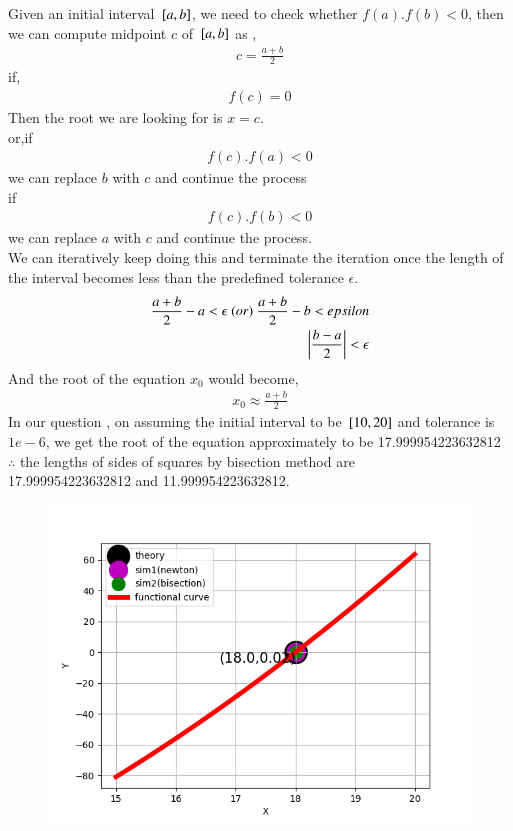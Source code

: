 \documentclass[journal]{IEEEtran}
\begin{document}
Given an initial interval ${}\left[a,b\right]$, we need to check whether $f(a).f(b)<0$, then we can compute midpoint $c$ of ${}\left[a,b\right]$ as ,
\begin{align}
    c = \frac{a + b}{2}
\end{align}
if, 
\begin{align}
    f(c) = 0
\end{align}
Then the root we are looking for is $x = c$.\\
or,if
\begin{align}
    f(c).f(a) < 0
\end{align}
we can replace $b$ with $c$ and continue the process\\
if
\begin{align}
    f(c).f(b) < 0
\end{align}
we can replace $a$ with $c$ and continue the process.\\
We can iteratively keep doing this and terminate the iteration once the length of the interval becomes less than the predefined tolerance $\epsilon$.
\begin{align}
\frac{a + b}{2} - a < \epsilon \ (or) \ \frac{a + b}{2} - b < epsilon\\
    \left\vert\frac{b - a}{2}\right\vert < \epsilon
\end{align}
And the root of the equation $x_0$ would become,
\begin{align}
    x_0 \approx \frac{a + b}{2}
\end{align}
In our question , on assuming the initial interval to be ${}\left[10,20\right]$ and tolerance is $1e-6$,
we get the root of the equation approximately to be 17.999954223632812\\
$\therefore$ the lengths of sides of squares by bisection method are\\ 17.999954223632812 and 11.999954223632812.
\begin{figure}[h!]
   \centering
   \includegraphics[width=1\columnwidth]{figures/Figure_1.png}
   \label{graph of the function}
\end{figure}
\end{document}
